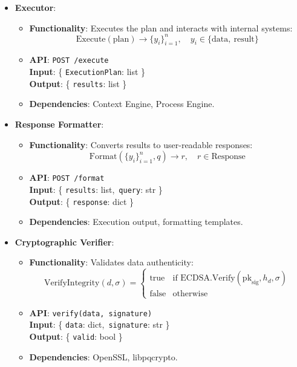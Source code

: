\documentclass[11pt]{article}
\begin{document}
\begin{itemize}
    \item \textbf{Executor}:
        \begin{itemize}
            \item \textbf{Functionality}: Executes the plan and interacts with internal systems:
                \[
                \text{Execute}(\text{plan}) \rightarrow \{ y_i \}_{i=1}^n,\quad y_i \in \{ \text{data},\ \text{result} \}
                \]
            \item \textbf{API}: \texttt{POST /execute} \\
            \textbf{Input}: \{ \texttt{ExecutionPlan}: list \} \\
            \textbf{Output}: \{ \texttt{results}: list \}
            \item \textbf{Dependencies}: Context Engine, Process Engine.
        \end{itemize}

    \item \textbf{Response Formatter}:
        \begin{itemize}
            \item \textbf{Functionality}: Converts results to user-readable responses:
                \[
                \text{Format}(\{ y_i \}_{i=1}^n, q) \rightarrow r,\quad r \in \text{Response}
                \]
            \item \textbf{API}: \texttt{POST /format} \\
            \textbf{Input}: \{ \texttt{results}: list,\ \texttt{query}: str \} \\
            \textbf{Output}: \{ \texttt{response}: dict \}
            \item \textbf{Dependencies}: Execution output, formatting templates.
        \end{itemize}

    \item \textbf{Cryptographic Verifier}:
        \begin{itemize}
            \item \textbf{Functionality}: Validates data authenticity:
                \[
                \text{VerifyIntegrity}(d, \sigma) = 
                \begin{cases}
                \text{true} & \text{if } \text{ECDSA.Verify}(\text{pk}_{\text{sig}}, h_d, \sigma) \\
                \text{false} & \text{otherwise}
                \end{cases}
                \]
            \item \textbf{API}: \texttt{verify(data, signature)} \\
            \textbf{Input}: \{ \texttt{data}: dict,\ \texttt{signature}: str \} \\
            \textbf{Output}: \{ \texttt{valid}: bool \}
            \item \textbf{Dependencies}: OpenSSL, libpqcrypto.
        \end{itemize}
\end{itemize}
\end{document}
